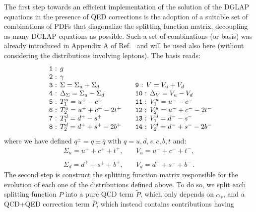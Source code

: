 \begin{widetext}
The first step towards an efficient implementation of the solution of
the DGLAP equations in the presence of QED corrections is the adoption
of a suitable set of combinations of PDFs that diagonalize the
splitting function matrix, decoupling as many DGLAP equations as
possible. Such a set of combinations (or basis) was already introduced
in Appendix A of Ref.~\cite{Bertone:2015lqa} and will be used also
here (without considering the distributions involving leptons). The
basis reads:
\begin{equation}\label{eq:EvolBasis}
\begin{array}{ll}
\mbox{\texttt{ 1} : }g & \\
\mbox{\texttt{ 2} : }\gamma & \\
\mbox{\texttt{ 3} : }\displaystyle \Sigma = \Sigma_u + \Sigma_d & \quad
\mbox{\texttt{9} : }\displaystyle V =V_u +  V_d\\
\mbox{\texttt{ 4} : } \displaystyle \Delta_\Sigma = \Sigma_u - \Sigma_d& \quad\displaystyle 
\mbox{\texttt{10} : } \Delta_V = V_u - V_d\\
\mbox{\texttt{ 5} : }T_1^u = u^+ - c^+ &\quad \mbox{\texttt{11} : }V_1^u = u^- - c^- \\
\mbox{\texttt{ 6} : }T_2^u = u^+ + c^+ - 2t^+ &\quad \mbox{\texttt{12} : }V_2^u = u^- + c^- - 2t^-\\
\mbox{\texttt{ 7} : }T_1^d = d^+ - s^+ &\quad \mbox{\texttt{13} : }V_1^d = d^- - s^- \\
\mbox{\texttt{ 8} : }T_2^d = d^+ + s^+ - 2b^+ &\quad \mbox{\texttt{14}
                                               : }V_2^d = d^- + s^- -
                                               2b^-\\
\end{array}
\end{equation}
where we have defined $q^\pm = q\pm\overline{q}$ with
$q = u,d,s,c,b,t$ and:
\begin{equation}
\begin{array}{ll}
\Sigma_u = u^++c^++t^+, &\quad V_u = u^-+c^-+t^-,\\
\\
\Sigma_d = d^++s^++b^+,&\quad V_d = d^-+s^-+b^-\,.
\end{array}
\end{equation}
The second step is construct the splitting function matrix responsible
for the evolution of each one of the distributions defined above. To
do so, we split each splitting function $P$ into a pure QCD term
$\widetilde{P}$, which only depends on $\alpha_s$, and a QCD+QED
correction term $\bar{P}$, which instead contains contributions having

\end{widetext}
